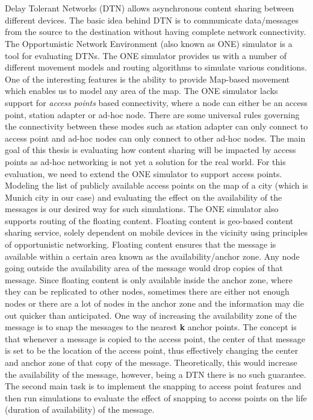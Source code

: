 \chapter{\abstractname}

Delay Tolerant Networks (DTN) allows asynchronous content sharing between different devices. The basic idea behind DTN is to communicate data/messages from the source to the destination without having complete network connectivity. The Opportunistic Network Environment (also known as ONE) simulator is a tool for evaluating DTNs. The ONE simulator provides us with a number of different movement models and routing algorithms to simulate various conditions. One of the interesting features is the ability to provide Map-based movement which enables us to model any area of the map.
The ONE simulator lacks support for \textit{access points} based connectivity, where a node can either be an access point, station adapter or ad-hoc node. There are some universal rules governing the connectivity between these modes such as station adapter can only connect to access point and ad-hoc nodes can only connect to other ad-hoc nodes. The main goal of this thesis is evaluating how content sharing will be impacted by access points as ad-hoc networking is not yet a solution for the real world. For this evaluation, we need to extend the ONE simulator to support access points. Modeling the list of publicly available access points on the map of a city (which is Munich city in our case) and evaluating the effect on the availability of the messages is our desired way for such simulations.
The ONE simulator also supports routing of the floating content. Floating content is geo-based content sharing service, solely dependent on mobile devices in the vicinity using principles of opportunistic networking. Floating content ensures that the message is available within a certain area known as the availability/anchor zone. Any node going outside the availability area of the message would drop copies of that message.
Since floating content is only available inside the anchor zone, where they can be replicated to other nodes, sometimes there are either not enough nodes or there are a lot of nodes in the anchor zone and the information may die out quicker than anticipated. One way of increasing the availability zone of the message is to snap the messages to the nearest \textbf{k} anchor points. The concept is that whenever a message is copied to the access point, the center of that message is set to be the location of the access point, thus effectively changing the center and anchor zone of that copy of the message. Theoretically, this would increase the availability of the message, however, being a DTN there is no such guarantee. The second main task is to implement the snapping to access point features and then run simulations to evaluate the effect of snapping to access points on the life (duration of availability) of the message.
